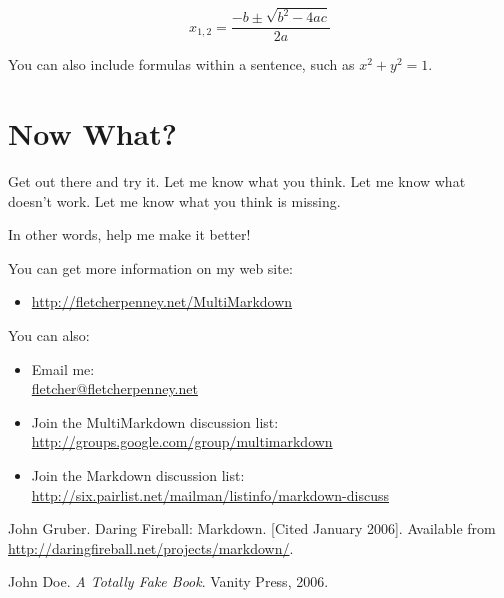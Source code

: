 \documentclass[oneside,article]{memoir}
\def\mybibliostyle{plain}
\def\bibliocommand{}
\begin{document}
\begin{equation}
\label{quadraticequationsolution}
{x}_{1,2}=\frac{-b\pm \sqrt{{b}^{2}-4ac}}{2a}
\end{equation}


You can also include formulas within a sentence, such as
${x}^{2}+{y}^{2}=1$.


\chapter{Now What?}
\label{nowwhat}

Get out there and try it. Let me know what you think. Let me know what doesn't
work. Let me know what you think is missing.


In other words, help me make it better!


You can get more information on my web site:


\begin{itemize}


\item \url{http://fletcherpenney.net/MultiMarkdown}
\end{itemize}

You can also:


\begin{itemize}


\item Email me: \\\href{mailto:fletcher@fletcherpenney.net}{fletcher@fletcherpenney.net}




\item Join the MultiMarkdown discussion list: \\\url{http://groups.google.com/group/multimarkdown}




\item Join the Markdown discussion list: \\\url{http://six.pairlist.net/mailman/listinfo/markdown-discuss}



\end{itemize}

\begin{thebibliography}{0}


John Gruber.  Daring Fireball: Markdown. [Cited January 2006]. Available from \url{http://daringfireball.net/projects/markdown/}.

John Doe. {\itshape A Totally Fake Book}.  Vanity Press, 2006.
		
\end{thebibliography}
		
%
%

\backmatter


\bibliocommand

\printglossary


\printindex
\end{document}
